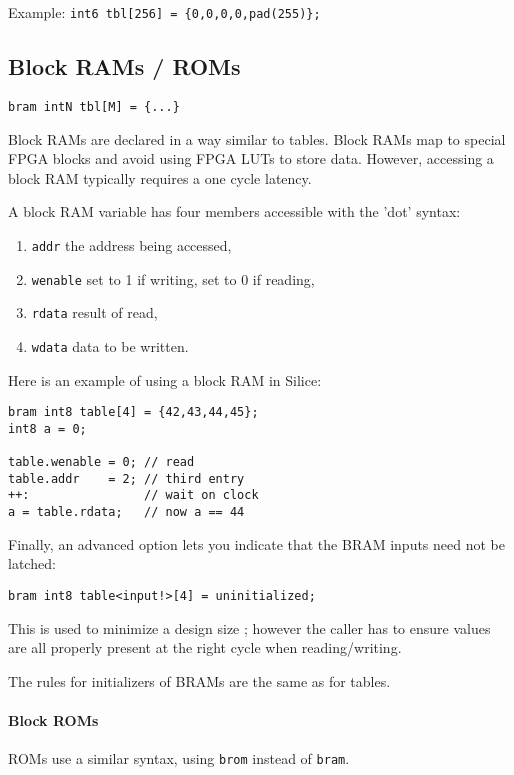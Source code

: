\documentclass[a4]{article}
\newcommand\silice{Silice}
\begin{document}
\noindent Example:  \texttt{int6 tbl[256] = \{0,0,0,0,pad(255)\};}

\subsection{Block RAMs / ROMs}

\texttt{bram intN tbl[M] = \{...\} }

\noindent Block RAMs are declared in a way similar to tables. Block RAMs map to special FPGA blocks and avoid using FPGA LUTs to store data. However, accessing a block RAM typically requires a one cycle latency.

A block RAM variable has four members accessible with the 'dot' syntax: 
\begin{enumerate}
	\item {\tt addr} the address being accessed,
	\item {\tt wenable} set to 1 if writing, set to 0 if reading,
	\item {\tt rdata} result of read,
	\item {\tt wdata} data to be written.
\end{enumerate}

Here is an example of using a block RAM in \silice{}:

\begin{verbatim}
bram int8 table[4] = {42,43,44,45};
int8 a = 0;

table.wenable = 0; // read
table.addr    = 2; // third entry
++:                // wait on clock
a = table.rdata;   // now a == 44
\end{verbatim}

Finally, an advanced option lets you indicate that the BRAM inputs need
not be latched:
\begin{verbatim}
bram int8 table<input!>[4] = uninitialized;
\end{verbatim}

This is used to minimize a design size ; however the caller has to ensure
values are all properly present at the right cycle when reading/writing.

The rules for initializers of BRAMs are the same as for tables.

\paragraph{Block ROMs}

ROMs use a similar syntax, using \texttt{brom} instead of \texttt{bram}.
\end{document}
